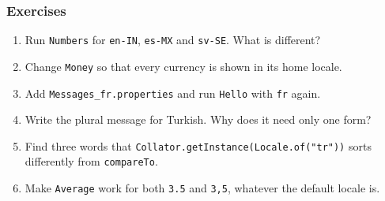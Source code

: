 \documentclass[aspectratio=169,10pt,compress]{beamer}
\begin{document}
\begin{frame}[t,fragile] \frametitle{Exercises}
  \begin{enumerate}\small
    \item Run \texttt{Numbers} for \texttt{en-IN}, \texttt{es-MX} and \texttt{sv-SE}. What is different?
    \item Change \texttt{Money} so that every currency is shown in its home locale.
    \item Add \texttt{Messages\_fr.properties} and run \texttt{Hello} with \texttt{fr} again.
    \item Write the plural message for Turkish. Why does it need only one form?
    \item Find three words that \texttt{Collator.getInstance(Locale.of("tr"))} sorts differently from \texttt{compareTo}.
    \item Make \texttt{Average} work for both \texttt{3.5} and \texttt{3,5}, whatever the default locale is.
  \end{enumerate}
\end{frame}




\begin{frame}[t,fragile]
	\begin{center}
		\vspace{4cm}
	\end{center}
\end{frame}
\end{document}
